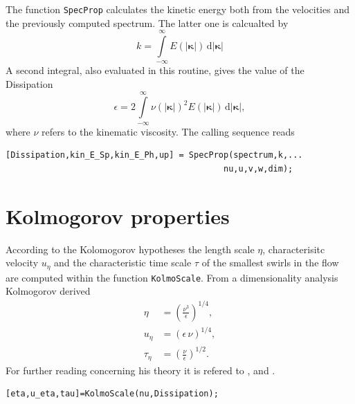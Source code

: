 \documentclass[preprint,12pt,ntfdMod]{elsarticle}
\begin{document}
\begin{par}

  The function \lstinline!SpecProp! calculates the kinetic energy both
  from the velocities and the previously computed spectrum. The latter
  one is calcualted by
  \begin{equation}
      k = \int\limits_{-\infty}^{\infty} E(|\boldsymbol\kappa|)\,\mathrm{d}|\boldsymbol\kappa|
  \end{equation}
  A second integral, also evaluated in this routine, gives the value
  of the Dissipation
  \begin{equation}
      \epsilon = 2\int\limits_{-\infty}^{\infty}\nu(|\boldsymbol\kappa|)^2
      E(|\boldsymbol\kappa|)\,\mathrm{d}|\boldsymbol\kappa|,
  \end{equation}
  where $\nu$ refers to the kinematic viscosity.
  The calling sequence reads

\end{par} \vspace{1em}
\begin{verbatim}
[Dissipation,kin_E_Sp,kin_E_Ph,up] = SpecProp(spectrum,k,...
                                            nu,u,v,w,dim);
\end{verbatim}
\begin{par}



\end{par} \vspace{1em}


\section{Kolmogorov properties}

\begin{par}

According to the Kolomogorov hypotheses the length scale $\eta$,
characterisitc velocity $u_{\eta}$ and the characteristic time scale
$\tau$ of the smallest swirls in the flow are computed
within the function \lstinline!KolmoScale!. From a dimensionality
analysis Kolmogorov derived
  \begin{eqnarray}
      \eta&=\left(\frac{\nu^3}{\epsilon}\right)^{1/4},\\
      u_{\eta}&=\left(\epsilon\,\nu\right)^{1/4},\\
      \tau_{\eta}&=\displaystyle\left(\frac{\nu}{\epsilon}\right)^{1/2}.
  \end{eqnarray}
For further reading concerning his theory it is refered to
\citet{Pope:2000tp}, \citet{Hinze:1975tb} and \citet{Tennekes:1972vb}.

\end{par} \vspace{1em}
\begin{verbatim}
[eta,u_eta,tau]=KolmoScale(nu,Dissipation);
\end{verbatim}
\begin{par}



\end{par} \vspace{1em}
\end{document}
